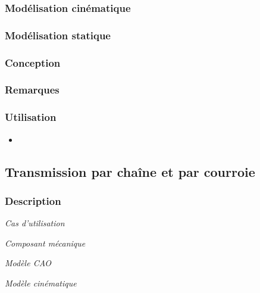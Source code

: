 \documentclass[11pt,oneside]{article}
\begin{document}
\subsubsection{Modélisation cinématique}
\subsubsection{Modélisation statique}
\subsubsection{Conception}
\subsubsection{Remarques}
\subsubsection{Utilisation}
\begin{itemize}
\item
\end{itemize}
\newpage

\subsection{Transmission par chaîne et par courroie}
\subsubsection{Description}

\begin{center}
\hfill
\begin{minipage}[c]{.21\linewidth}
\begin{center}
\textit{Cas d'utilisation}
\end{center}
\end{minipage} \hfill
\begin{minipage}[c]{.21\linewidth}
\begin{center}
\textit{Composant mécanique}
\end{center}
\end{minipage} \hfill
\begin{minipage}[c]{.21\linewidth}
\begin{center}
\textit{Modèle CAO}
\end{center} 
\end{minipage}\hfill
\begin{minipage}[c]{.21\linewidth}
\begin{center}
\textit{Modèle cinématique}
\end{center} 
\end{minipage}\hfill
\end{center}
\end{document}
